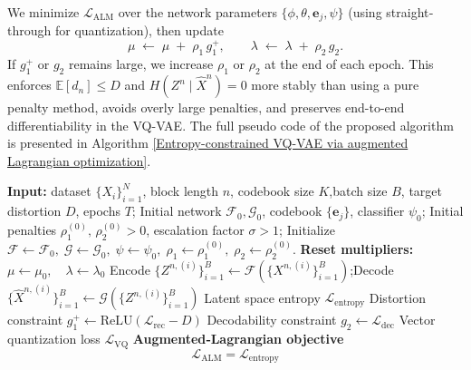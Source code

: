 \documentclass[12pt,review,authoryear]{elsarticle}
\theoremstyle{upright}
\begin{document}
We minimize \(\mathcal{L}_{\mathrm{ALM}}\) over the network parameters \(\{\phi,\theta,\mathbf{e}_j,\psi\}\) (using straight‐through for quantization), then update
\[
\mu \;\leftarrow\; \mu \;+\; \rho_1\,g_1^+,
\qquad
\lambda \;\leftarrow\; \lambda \;+\; \rho_2\,g_2.
\]
If \(g_1^+\) or \(g_2\) remains large, we increase \(\rho_1\) or \(\rho_2\) at the end of each epoch.  This enforces \(\mathbb{E}[d_n]\le D\) and \(H(Z^n\mid\hat{X}^n)=0\) more stably than using a pure penalty method, avoids overly large penalties, and preserves end-to-end differentiability in the VQ-VAE. The full pseudo code of the proposed algorithm is presented in Algorithm \ref{Entropy-constrained VQ-VAE via augmented Lagrangian optimization}.


\begin{algorithm}[t!]
\caption{Entropy-constrained VQ-VAE via augmented Lagrangian optimization}
\label{Entropy-constrained VQ-VAE via augmented Lagrangian optimization}
\begin{algorithmic}[1]
\State \textbf{Input:} dataset \(\{X_i\}_{i=1}^N\), block length \(n\), codebook size \(K\),batch size \(B\), target distortion \(D\), epochs \(T\);  
\Statex \quad Initial network \(\mathcal{F}_0,\mathcal{G}_0\), codebook \(\{\mathbf{e}_j\}\), classifier \(\psi_0\);  
\Statex \quad Initial penalties \(\rho_1^{(0)},\,\rho_2^{(0)}>0\), escalation factor \(\sigma>1\);  
\State  \quad Initialize \(\mathcal{F}\leftarrow\mathcal{F}_0,\;\mathcal{G}\leftarrow\mathcal{G}_0,\;\psi\leftarrow\psi_0,\;\rho_1\leftarrow\rho_1^{(0)},\;\rho_2\leftarrow\rho_2^{(0)}\).
%
    \State \textbf{Reset multipliers:}\; $\mu\leftarrow\mu_{\mathrm{0}},\quad \lambda\leftarrow\lambda_{\mathrm{0}}$
        \State Encode $\{Z^{n,(i)}\}_{i=1}^B\leftarrow\mathcal{F}(\{X^{n,(i)}\}_{i=1}^B)$;\quad Decode $\{\hat{X}^{n,(i)}\}_{i=1}^B\leftarrow\mathcal{G}(\{Z^{n,(i)}\}_{i=1}^B)$
        \State Latent space entropy $\mathcal{L}_{\mathrm{entropy}}$
        \State Distortion constraint $g_{1}^+\leftarrow \text{ReLU} \left(\mathcal{L}_{\mathrm{rec}}-D\right) $
        \State Decodability constraint $g_{2}\leftarrow \mathcal{L}_{\mathrm{dec}} $
        \State Vector quantization loss $\mathcal{L}_{\mathrm{VQ}}$
        \State \textbf{Augmented‑Lagrangian objective}
                \[
                \mathcal{L}_{\mathrm{ALM}}
                =
                \mathcal{L}_{\mathrm{entropy}}
\]
\end{algorithmic}
\end{algorithm}
\end{document}
